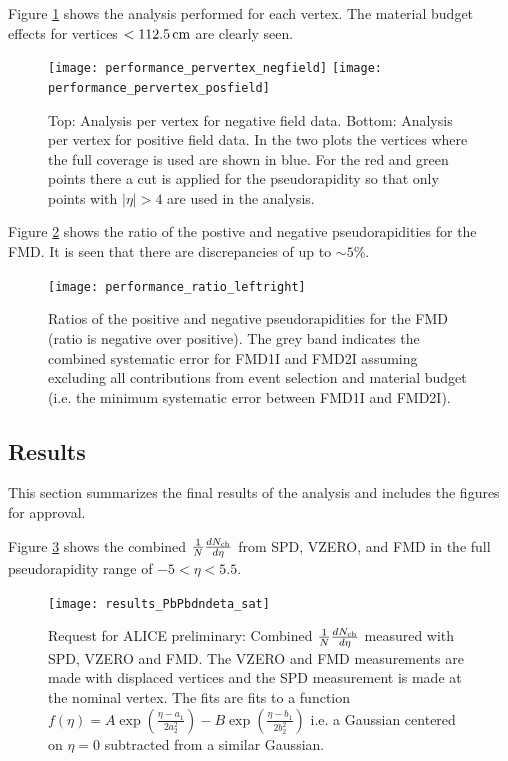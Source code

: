 \documentclass[11pt]{article}
\begin{document}
Figure \ref{pervertex} shows the analysis performed for each
vertex. The material budget effects for vertices $<\cm{112.5}$ are
clearly seen.

\begin{figure}
  \centering
  \texttt{[image: performance\_pervertex\_negfield]}
  \texttt{[image: performance\_pervertex\_posfield]}
  \caption{Top: Analysis per vertex for negative field data. Bottom:
    Analysis per vertex for positive field data. In the two plots the
    vertices where the full coverage is used are shown in blue. For
    the red and green points there a cut is applied for the
    pseudorapidity so that only points with $|\eta|>4$ are used in the
    analysis.}
\label{pervertex}
\end{figure} 

Figure \ref{leftright} shows the ratio of the postive and negative
pseudorapidities for the FMD. It is seen that there are discrepancies
of up to $\sim 5 \%$.
\begin{figure}
  \centering
  \texttt{[image: performance\_ratio\_leftright]}
  \caption{Ratios of the positive and negative pseudorapidities for
    the FMD (ratio is negative over positive). The grey band indicates
    the combined systematic error for FMD1I and FMD2I assuming
    excluding all contributions from event selection and material
    budget (i.e. the minimum systematic error between FMD1I and
    FMD2I).}  \label{leftright}
\end{figure} 

\subsection{Results}

This section summarizes the final results of the analysis and includes
the figures for approval.

Figure \ref{combineddndeta} shows the combined $\dndeta$ from SPD,
VZERO, and FMD in the full pseudorapidity range of $-5<\eta<5.5$.

\begin{figure}
  \centering
  \texttt{[image: results\_PbPbdndeta\_sat]}
  \caption{Request for ALICE preliminary: Combined $\dndeta$ measured
    with SPD, VZERO and FMD. The VZERO and FMD measurements are made
    with displaced vertices and the SPD measurement is made at the
    nominal vertex. The fits are fits to a function $f(\eta) = A\exp
    (\frac{\eta -a_1}{2 a_2^2}) - B\exp (\frac{\eta -b_1}{2 b_{2}^2})$
    i.e. a Gaussian centered on $ \eta = 0$ subtracted from a similar
    Gaussian.}
  \label{combineddndeta}
\end{figure} 
\end{document}
